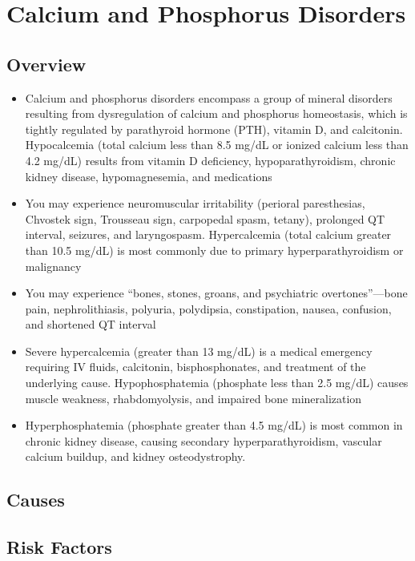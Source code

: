 \chapter{Calcium and Phosphorus Disorders}
\label{sec:Calcium and Phosphorus Disorders}

\section{Overview}


\begin{itemize}[noitemsep]
  \item Calcium and phosphorus disorders encompass a group of mineral disorders resulting from dysregulation of calcium and phosphorus homeostasis, which is tightly regulated by parathyroid hormone (PTH), vitamin D, and calcitonin. Hypocalcemia (total calcium less than 8.5 mg/dL or ionized calcium less than 4.2 mg/dL) results from vitamin D deficiency, hypoparathyroidism, chronic kidney disease, hypomagnesemia, and medications
  \item You may experience neuromuscular irritability (perioral paresthesias, Chvostek sign, Trousseau sign, carpopedal spasm, tetany), prolonged QT interval, seizures, and laryngospasm. Hypercalcemia (total calcium greater than 10.5 mg/dL) is most commonly due to primary hyperparathyroidism or malignancy
  \item You may experience ``bones, stones, groans, and psychiatric overtones''---bone pain, nephrolithiasis, polyuria, polydipsia, constipation, nausea, confusion, and shortened QT interval
  \item Severe hypercalcemia (greater than 13 mg/dL) is a medical emergency requiring IV fluids, calcitonin, bisphosphonates, and treatment of the underlying cause. Hypophosphatemia (phosphate less than 2.5 mg/dL) causes muscle weakness, rhabdomyolysis, and impaired bone mineralization
  \item Hyperphosphatemia (phosphate greater than 4.5 mg/dL) is most common in chronic kidney disease, causing secondary hyperparathyroidism, vascular calcium buildup, and kidney osteodystrophy.
\end{itemize}
\section{Causes}
\section{Risk Factors}

